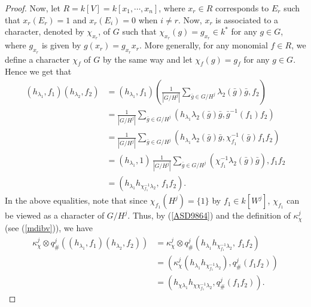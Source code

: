 \documentclass[11pt,reqno]{amsart}
\theoremstyle{definition}
\begin{document}
\begin{proof}
Now, let $R = k[V] = k[x_{1}, \cdots, x_n]$, 
where $x_r \in R$ corresponds to $E_r$ such that $x_r(E_r) = 1$ 
and 
$x_{r}(E_i) = 0$ when $i \neq r$. 
Now, $x_r$ is associated to a character, denoted by 
$\chi_{x_r}$, of $G$ such that $\chi_{x_r}(g) = 
g_{x_r} \in k^\ast$ for any $g \in G$, where $g_{x_r}$ is given by $g(x_r) = g_{x_r} x_r$.
More generally, 
for any monomial $f \in R$, we 
define a character $\chi_f$ of $G$ by the same way and let 
$\chi_{f}(g) = g_{f}$ for any $g \in G$. 
Hence we get that 
\begin{align}
(h_{\lambda_1}, f_1)(h_{\lambda_2}, f_2) & = (h_{\lambda_1}, f_1)
(\frac{1}{|G/H^j|} \sum\limits_{\bar{g} \in G/H^j} \lambda_2(\bar{g})\bar{g} , f_2 ) \nonumber \\ 
& = \frac{1}{|G/H^j|} \sum\limits_{\bar{g} \in G/H^j} 
(h_{\lambda_1} \lambda_2(\bar{g}) \bar{g}, \bar{g}^{-1}(f_1) f_2 ) \nonumber \\
& = \frac{1}{|G/H^j|} \sum\limits_{\bar{g} \in G/H^j} (h_{\lambda_1} 
\lambda_2(\bar{g}) \bar{g}, \chi^{-1}_{f_1}(\bar{g}) f_1 f_2 ) \nonumber \\
&= 
(h_{\lambda_1}, 1) \, \frac{1}{|G/H^j|} \sum\limits_{\bar{g} \in G/H^j} 
( \chi^{-1}_{f_1}\lambda_2(\bar{g}) \bar{g} ), f_1 f_2   \nonumber \\
& = (h_{\lambda_1} h_{\chi^{-1}_{f_1}\lambda_2}, \,  f_1 f_2). \label{ASD9864}
\end{align}
In the
above equalities, note that since $\chi_{f_1}(H^j) = \{1 \}$ by $f_1 \in k[W^j]$, $\chi_{f_1}$ 
can be viewed as a character of $G/H^j$.
Thus, by (\ref{ASD9864}) and
the definition of $\kappa^{j}_{\chi}$ 
(see (\ref{mdibv})), we have 
\begin{align}\label{jucbweib}
\kappa^{j}_{\chi} \otimes q^j_{\#} ( (h_{\lambda_1}, f_1)(h_{\lambda_2}, f_2) ) 
& = \kappa^{j}_{\chi} \otimes q^j_{\#}
(h_{\lambda_1} h_{\chi^{-1}_{f_1}\lambda_2}, \,  f_1 f_2)\nonumber\\
& = ( \kappa^{j}_{\chi}(h_{ \lambda_1} 
h_{\chi^{-1}_{f_1}\lambda_2}), q^j_{\#}(f_1 f_2) ) \nonumber \\ 
& = ( h_{ \chi \lambda_1} h_{\chi \chi^{-1}_{f_1}\lambda_2}, q^j_{\#}(f_1 f_2) ). 
\end{align}



\end{proof}
\end{document}
